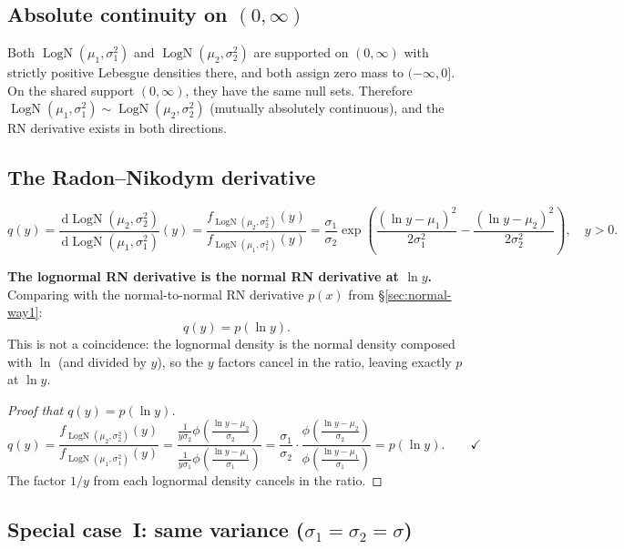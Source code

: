 \documentclass[11pt,a4paper]{article}
\newcommand{\LN}{\operatorname{LogN}}
\newcommand{\dif}{\,\mathrm{d}}
\begin{document}
\subsection{Absolute continuity on $(0,\infty)$}

Both $\LN(\mu_1,\sigma_1^2)$ and $\LN(\mu_2,\sigma_2^2)$ are supported on $(0,\infty)$ with
strictly positive Lebesgue densities there, and both assign zero mass to $(-\infty,0]$.
On the shared support $(0,\infty)$, they have the same null sets.
Therefore $\LN(\mu_1,\sigma_1^2)\sim\LN(\mu_2,\sigma_2^2)$ (mutually absolutely continuous),
and the RN derivative exists in both directions.

\subsection{The Radon--Nikodym derivative}

\[
  q(y)
  =\frac{\dif\LN(\mu_2,\sigma_2^2)}{\dif\LN(\mu_1,\sigma_1^2)}(y)
  =\frac{f_{\LN(\mu_2,\sigma_2^2)}(y)}{f_{\LN(\mu_1,\sigma_1^2)}(y)}
  =\frac{\sigma_1}{\sigma_2}
    \exp\!\left(\frac{(\ln y-\mu_1)^2}{2\sigma_1^2}-\frac{(\ln y-\mu_2)^2}{2\sigma_2^2}\right),
  \quad y>0.
\]

\noindent\textbf{The lognormal RN derivative is the normal RN derivative at $\ln y$.}
Comparing with the normal-to-normal RN derivative $p(x)$ from \S\ref{sec:normal-way1}:
\[
  \boxed{q(y)=p(\ln y).}
\]
This is not a coincidence: the lognormal density is the normal density composed with $\ln$
(and divided by $y$), so the $y$ factors cancel in the ratio, leaving exactly $p$ at $\ln y$.

\begin{proof}[Proof that $q(y)=p(\ln y)$]
\[
  q(y)
  =\frac{f_{\LN(\mu_2,\sigma_2^2)}(y)}{f_{\LN(\mu_1,\sigma_1^2)}(y)}
  =\frac{\frac{1}{y\sigma_2}\phi\!\left(\frac{\ln y-\mu_2}{\sigma_2}\right)}
         {\frac{1}{y\sigma_1}\phi\!\left(\frac{\ln y-\mu_1}{\sigma_1}\right)}
  =\frac{\sigma_1}{\sigma_2}\cdot
   \frac{\phi\!\left(\frac{\ln y-\mu_2}{\sigma_2}\right)}
        {\phi\!\left(\frac{\ln y-\mu_1}{\sigma_1}\right)}
  =p(\ln y).\qquad\checkmark
\]
The factor $1/y$ from each lognormal density cancels in the ratio.
\end{proof}

\subsection{Special case~I: same variance ($\sigma_1=\sigma_2=\sigma$)}
\end{document}
